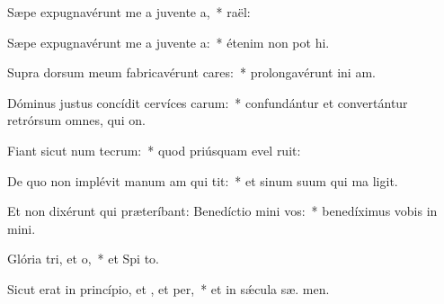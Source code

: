 \item Sæpe expugnavérunt me a juvente a,~*   raël:
\item Sæpe expugnavérunt me a juvente a:~* étenim non pot hi.
\item Supra dorsum meum fabricavérunt cares:~* prolongavérunt ini am.
\item Dóminus justus concídit cervíces carum:~* confundántur et convertántur retrórsum omnes, qui  on.
\item Fiant sicut num tecrum:~* quod priúsquam evel ruit:
\item De quo non implévit manum am qui tit:~* et sinum suum qui ma ligit.
\item Et non dixérunt qui præteríbant: Benedíctio mini  vos:~* benedíximus vobis in  mini.
\item Glória tri, et o,~* et Spi to.
\item Sicut erat in princípio, et , et per,~* et in sǽcula sæ. men.

